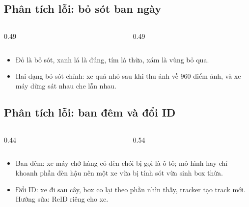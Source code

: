 \documentclass[aspectratio=\mlwAspectRatio, \mlwBaseSize, t]{beamer}
\begin{document}
\subsection{Phân tích lỗi: bỏ sót ban ngày}
\begin{frame}{\stitle}
  \begin{columns}[T]
    \begin{column}{0.49\textwidth}
      \centering
    \end{column}
    \begin{column}{0.49\textwidth}
      \centering
    \end{column}
  \end{columns}
  \vspace{0.4em}
  \begin{itemize}
    \item Đỏ là bỏ sót, xanh lá là đúng, tím là thừa, xám là vùng bỏ qua.
    \item Hai dạng bỏ sót chính: xe quá nhỏ sau khi thu ảnh về 960 điểm ảnh, và xe máy dừng sát nhau che lẫn nhau.
  \end{itemize}
\end{frame}

\subsection{Phân tích lỗi: ban đêm và đổi ID}
\begin{frame}{\stitle}
  \begin{columns}[T]
    \begin{column}{0.44\textwidth}
      \centering
    \end{column}
    \begin{column}{0.54\textwidth}
      \centering
    \end{column}
  \end{columns}
  \vspace{0.4em}
  \begin{itemize}
    \item Ban đêm: xe máy chở hàng có đèn chói bị gọi là ô tô; mô hình hay chỉ khoanh phần đèn hậu nên một xe vừa bị
          tính sót vừa sinh box thừa.
    \item Đổi ID: xe đi sau cây, box co lại theo phần nhìn thấy, tracker tạo track mới. Hướng sửa: \alert{ReID riêng cho
          xe}.
  \end{itemize}
\end{frame}
\end{document}
